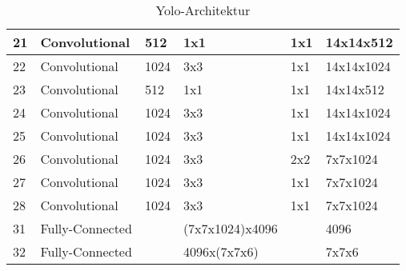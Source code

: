 \begin{table}
\begin{tabularx}{1.1\textwidth}{|l|l|l|l|l|X|}
\hline  	21	& Convolutional		& 512	& 1x1	& 1x1	& 14x14x512	\\
\hline  	22	& Convolutional		& 1024	& 3x3	& 1x1	& 14x14x1024	\\
\hline  	23	& Convolutional		& 512	& 1x1	& 1x1	& 14x14x512	\\
\hline  	24	& Convolutional		& 1024	& 3x3	& 1x1	& 14x14x1024	\\
\hline  	25	& Convolutional		& 1024	& 3x3	& 1x1	& 14x14x1024	\\
\hline  	26	& Convolutional		& 1024	& 3x3	& 2x2	& 7x7x1024	\\
\hline  	27	& Convolutional		& 1024	& 3x3	& 1x1	& 7x7x1024	\\
\hline  	28	& Convolutional		& 1024	& 3x3	& 1x1	& 7x7x1024	\\
\hline 	31	& Fully-Connected	&		&(7x7x1024)x4096	&	& 4096  \\
\hline  	32	& Fully-Connected	&		& 4096x(7x7x6)	&	& 7x7x6 \\
\hline 	
\end{tabularx}
\caption{Yolo-Architektur}
\label{tbl:yolo_architektur}
\end{table}
